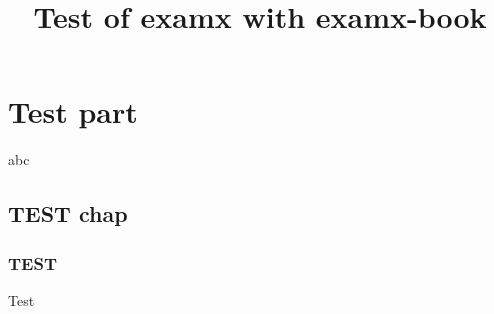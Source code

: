 \documentclass{article}
\title{Test of examx with examx-book}
\begin{document}
    \maketitle
    
    
    \part{Test part}
    
    abc
    \chapter{TEST chap}
    \section{TEST}
    Test
\end{document}
